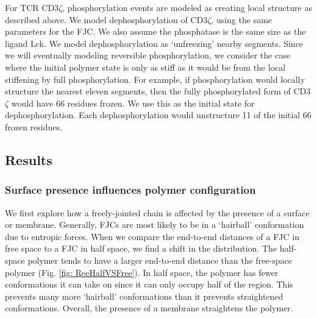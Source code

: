 \documentclass[../../AdvancementSummary.tex]{subfiles}
\begin{document}
For TCR CD3$\zeta$, phosphorylation events are modeled as creating local structure as described above. We model dephosphorylation of CD3$\zeta$, using the same parameters for the FJC. We also assume the phosphatase is the same size as the ligand Lck. We model dephosphorylation as `unfreezing' nearby segments. Since we will eventually modeling reversible phosphorylation, we consider the case where the initial polymer state is only as stiff as it would be from the local stiffening by full phosphorylation. For example, if phosphorylation would locally structure the nearest eleven segments, then the fully phosphorylated form of CD3$\zeta$ would have 66 residues frozen. We use this as the initial state for dephosphorylation. Each dephosphorylation would unstructure 11 of the initial 66 frozen residues. 


\subsection{Results}

\subsubsection{Surface presence influences polymer configuration}
We first explore how a freely-jointed chain is affected by the presence of a surface or membrane. Generally, FJCs are most likely to be in a `hairball' conformation due to entropic forces. When we compare the end-to-end distances of a FJC in free space to a FJC in half space, we find a shift in the distribution. The half-space polymer tends to have a larger end-to-end distance than the free-space polymer (Fig. \ref{fig: ReeHalfVSFree}). In half space, the polymer has fewer conformations it can take on since it can only occupy half of the region. This prevents many more `hairball' conformations than it prevents straightened conformations. Overall, the presence of a membrane straightens the polymer. 
\end{document}
